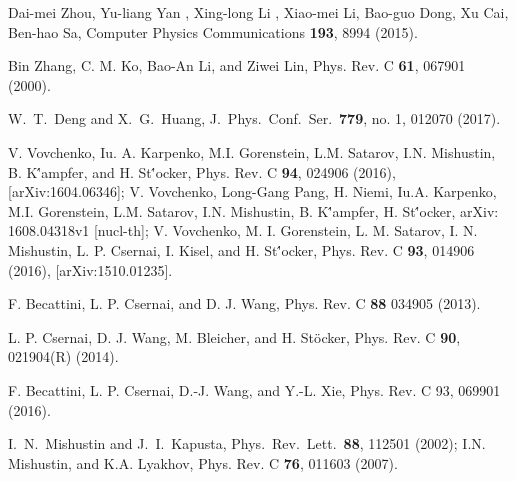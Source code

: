 \documentclass[aps,prc,twocolumn,floatfix,showpacs,a4paper,
nofootinbib,amsmath,amssymb]{revtex4-1}
\begin{document}
\begin{thebibliography}{99}
  
  

Dai-mei Zhou, Yu-liang Yan , Xing-long Li , Xiao-mei Li, 
Bao-guo Dong, Xu Cai, Ben-hao Sa, 
Computer Physics Communications  {\bf 193}, 8994 (2015).

Bin Zhang, C. M. Ko, Bao-An Li, and Ziwei Lin,
Phys. Rev. C {\bf 61}, 067901 (2000).


 W.~T.~Deng and X.~G.~Huang,
  J.\ Phys.\ Conf.\ Ser.\  {\bf 779}, no. 1, 012070 (2017).


V. Vovchenko, Iu. A. Karpenko, M.I. Gorenstein, 
L.M. Satarov, I.N. Mishustin, B. K\''ampfer, and H. St\''ocker, 
Phys. Rev. C {\bf 94},  024906 (2016),  [arXiv:1604.06346];
%
V. Vovchenko, Long-Gang Pang, H. Niemi, Iu.A. Karpenko, 
M.I. Gorenstein, L.M. Satarov, I.N. Mishustin, B. K\''ampfer, H. St\''ocker,
arXiv: 1608.04318v1 [nucl-th];
%
V. Vovchenko, M. I. Gorenstein, L. M. Satarov, 
I. N. Mishustin, L. P. Csernai, I. Kisel, and H. St\''ocker,
Phys. Rev. C {\bf 93},   014906 (2016), [arXiv:1510.01235].

F. Becattini, L. P. Csernai, and D. J. Wang,
Phys. Rev. C {\bf 88} 034905 (2013).

L. P. Csernai, D. J. Wang, M. Bleicher, and H. St\"ocker,
Phys. Rev. C {\bf 90}, 021904(R) (2014).

F. Becattini, L. P. Csernai, D.-J. Wang, and Y.-L. Xie,
Phys. Rev. C 93, 069901 (2016).



 I.~N.~Mishustin and J.~I.~Kapusta,
Phys.\ Rev.\ Lett.\  {\bf 88}, 112501 (2002);
I.N. Mishustin, and K.A. Lyakhov, Phys. Rev. C {\bf 76}, 011603 (2007).


\end{thebibliography}
\end{document}
